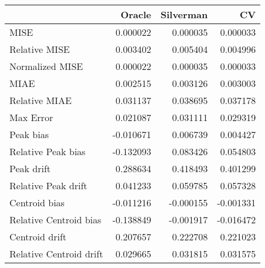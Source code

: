 \begin{tabular}{lrrr}
  \hline
 & Oracle & Silverman & CV \\ 
  \hline
MISE & 0.000022 & 0.000035 & 0.000033 \\ 
  Relative MISE & 0.003402 & 0.005404 & 0.004996 \\ 
  Normalized MISE & 0.000022 & 0.000035 & 0.000033 \\ 
  MIAE & 0.002515 & 0.003126 & 0.003003 \\ 
  Relative MIAE & 0.031137 & 0.038695 & 0.037178 \\ 
  Max Error & 0.021087 & 0.031111 & 0.029319 \\ 
  Peak bias & -0.010671 & 0.006739 & 0.004427 \\ 
  Relative Peak bias & -0.132093 & 0.083426 & 0.054803 \\ 
  Peak drift & 0.288634 & 0.418493 & 0.401299 \\ 
  Relative Peak drift & 0.041233 & 0.059785 & 0.057328 \\ 
  Centroid bias & -0.011216 & -0.000155 & -0.001331 \\ 
  Relative Centroid bias & -0.138849 & -0.001917 & -0.016472 \\ 
  Centroid drift & 0.207657 & 0.222708 & 0.221023 \\ 
  Relative Centroid drift & 0.029665 & 0.031815 & 0.031575 \\ 
   \hline
\end{tabular}
